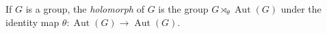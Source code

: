 \documentclass[12pt]{article}
\newcommand{\Aut}{\operatorname{Aut}}
\newcommand{\semidirect}{\rtimes}
\begin{document}
If $G$ is a group, the \emph{holomorph} of $G$ is the group
$G \semidirect_{\theta} \Aut(G)$
under the identity map $\theta:\Aut(G)\to\Aut(G)$.
\end{document}
